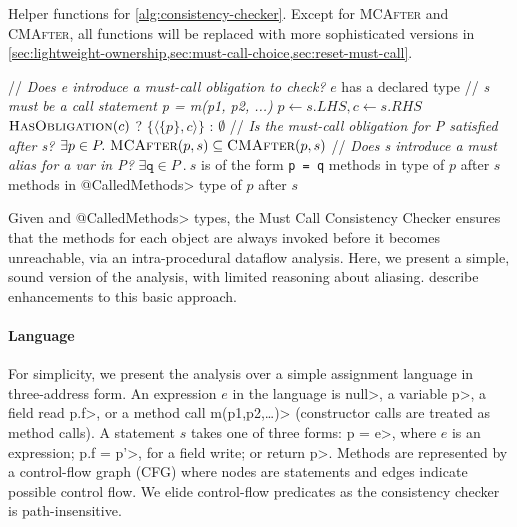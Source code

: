 \begin{algorithm}[h]
  \caption{Helper functions for \cref{alg:consistency-checker}.  Except for
  \textsc{MCAfter} and \textsc{CMAfter}, all functions will be replaced with
  more sophisticated versions in
  \cref{sec:lightweight-ownership,sec:must-call-choice,sec:reset-must-call}.
}
  \label{alg:helpers}
  \begin{algorithmic}[1]
  \State // \textit{Does e introduce a must-call obligation to check?}
  \State \Return $e$ has a declared \MustCall type
  \EndProcedure
  \State // \textit{s must be a call statement p = m(p1, p2, ...)}
  \State $p \gets s.LHS, c \gets s.RHS$
  \State \Return $\textsc{HasObligation}(c)$ ? $\{ \langle \{ p \}, c
  \rangle \}$ : $\emptyset$
  \EndProcedure
  \State // \textit{Is the must-call obligation for P satisfied after
    s?}
  \State \Return $\exists p \in P .\ \textsc{MCAfter}(p,s) \subseteq \textsc{CMAfter}(p,s)$
  \EndProcedure
  \State // \textit{Does s introduce a must alias for a var in P?}
    \State \Return $\exists \mathtt{q} \in P\ .\ s$ is of the form \texttt{p = q}
  \EndProcedure
  \State \Return methods in \MustCall type of $p$ after $s$
  \EndProcedure
  \State \Return methods in \<@CalledMethods> type of $p$ after $s$
  \EndProcedure
  \end{algorithmic}

\end{algorithm}

Given \MustCall and \<@CalledMethods> types, the Must
Call Consistency Checker ensures that the \MustCall methods for each object
are always invoked before it becomes unreachable,
via an intra-procedural dataflow analysis.  Here, we present
a simple, sound version of the analysis, with limited reasoning about aliasing.
describe enhancements to this basic approach.

\paragraph{Language} For simplicity, we present the analysis over a simple
assignment language in three-address form.  An expression $e$ in the language is
\<null>, a variable \<p>, a field read \<p.f>, or a method call \<m(p1,p2,\ldots)> (constructor
calls are treated as method calls).  A statement $s$ takes one of three forms:
\<p = e>, where $e$ is an expression; \<p.f = p'>, for a field write; or
\<return p>.  Methods are represented by a control-flow graph (CFG) where nodes
are statements and edges indicate possible control flow.  We elide control-flow
predicates as the consistency checker is path-insensitive.

